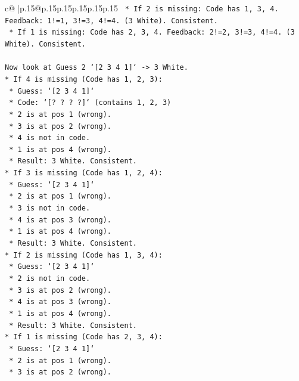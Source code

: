 \documentclass{article}
\begin{document}
{\begin{supertabular}{c@{$\;$}|p{.15\linewidth}@{}p{.15\linewidth}p{.15\linewidth}p{.15\linewidth}p{.15\linewidth}p{.15\linewidth}}
{{{\texttt{    *   If 2 is missing: Code has 1, 3, 4. Feedback: 1!=1, 3!=3, 4!=4. (3 White). Consistent.} \\
\texttt{    *   If 1 is missing: Code has 2, 3, 4. Feedback: 2!=2, 3!=3, 4!=4. (3 White). Consistent.} \\
\\ 
\texttt{Now look at Guess 2 `{[}2 3 4 1{]}` {-}> 3 White.} \\
\texttt{*   If 4 is missing (Code has 1, 2, 3):} \\
\texttt{    *   Guess: `{[}2 3 4 1{]}`} \\
\texttt{    *   Code: `{[}? ? ? ?{]}` (contains 1, 2, 3)} \\
\texttt{    *   2 is at pos 1 (wrong).} \\
\texttt{    *   3 is at pos 2 (wrong).} \\
\texttt{    *   4 is not in code.} \\
\texttt{    *   1 is at pos 4 (wrong).} \\
\texttt{    *   Result: 3 White. Consistent.} \\
\texttt{*   If 3 is missing (Code has 1, 2, 4):} \\
\texttt{    *   Guess: `{[}2 3 4 1{]}`} \\
\texttt{    *   2 is at pos 1 (wrong).} \\
\texttt{    *   3 is not in code.} \\
\texttt{    *   4 is at pos 3 (wrong).} \\
\texttt{    *   1 is at pos 4 (wrong).} \\
\texttt{    *   Result: 3 White. Consistent.} \\
\texttt{*   If 2 is missing (Code has 1, 3, 4):} \\
\texttt{    *   Guess: `{[}2 3 4 1{]}`} \\
\texttt{    *   2 is not in code.} \\
\texttt{    *   3 is at pos 2 (wrong).} \\
\texttt{    *   4 is at pos 3 (wrong).} \\
\texttt{    *   1 is at pos 4 (wrong).} \\
\texttt{    *   Result: 3 White. Consistent.} \\
\texttt{*   If 1 is missing (Code has 2, 3, 4):} \\
\texttt{    *   Guess: `{[}2 3 4 1{]}`} \\
\texttt{    *   2 is at pos 1 (wrong).} \\
\texttt{    *   3 is at pos 2 (wrong).} \\
}}}
\end{supertabular}}
\end{document}
